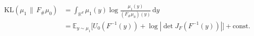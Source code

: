 \documentclass[border=2pt,12pt]{standalone}
\begin{document}
$\displaystyle
\begin{aligned}
\mathrm{KL}(\mu_1 \,\|\, F_{\#}\mu_0)
& = \int_{\mathbb{R}^d} \mu_1(y) \log \frac{\mu_1(y)}{(F_{\#}\mu_0)(y)} \, \mathrm{d}y \\
& = \mathbb{E}_{y \sim \mu_1} \bigl[ U_0(F^{-1}(y)) + \log |\det J_F(F^{-1}(y))| \bigr] + \mathrm{const}.
\end{aligned}$
\end{document}
